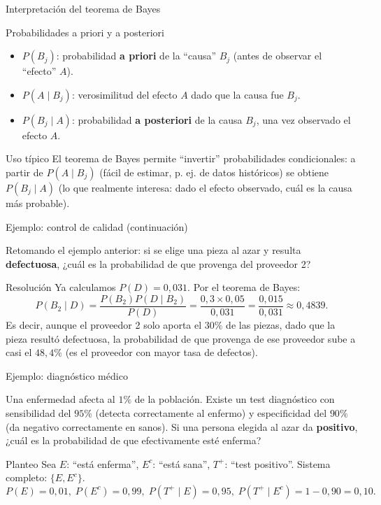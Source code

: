 \documentclass[aspectratio=169,11pt]{beamer}
\begin{document}
\begin{frame}{Interpretación del teorema de Bayes}
\begin{block}{Probabilidades a priori y a posteriori}
\begin{itemize}
\item $P(B_j)$: probabilidad \textbf{a priori} de la ``causa'' $B_j$ (antes de observar el ``efecto'' $A$).
\item $P(A\mid B_j)$: verosimilitud del efecto $A$ dado que la causa fue $B_j$.
\item $P(B_j\mid A)$: probabilidad \textbf{a posteriori} de la causa $B_j$, una vez observado el efecto $A$.
\end{itemize}
\end{block}
\begin{alertblock}{Uso típico}
El teorema de Bayes permite ``invertir'' probabilidades condicionales: a partir de $P(A\mid B_j)$ (fácil de estimar, p. ej. de datos históricos) se obtiene $P(B_j\mid A)$ (lo que realmente interesa: dado el efecto observado, cuál es la causa más probable).
\end{alertblock}
\end{frame}

\begin{frame}{Ejemplo: control de calidad (continuación)}
\begin{example}
Retomando el ejemplo anterior: si se elige una pieza al azar y resulta \textbf{defectuosa}, ¿cuál es la probabilidad de que provenga del proveedor 2?
\end{example}
\begin{block}{Resolución}
Ya calculamos $P(D) = 0{,}031$. Por el teorema de Bayes:
\[
P(B_2\mid D) = \frac{P(B_2)P(D\mid B_2)}{P(D)} = \frac{0{,}3 \times 0{,}05}{0{,}031} = \frac{0{,}015}{0{,}031} \approx 0{,}4839.
\]
Es decir, aunque el proveedor 2 solo aporta el $30\%$ de las piezas, dado que la pieza resultó defectuosa, la probabilidad de que provenga de ese proveedor sube a casi el $48{,}4\%$ (es el proveedor con mayor tasa de defectos).
\end{block}
\end{frame}

\begin{frame}{Ejemplo: diagnóstico médico}
\begin{example}
Una enfermedad afecta al $1\%$ de la población. Existe un test diagnóstico con sensibilidad del $95\%$ (detecta correctamente al enfermo) y especificidad del $90\%$ (da negativo correctamente en sanos). Si una persona elegida al azar da \textbf{positivo}, ¿cuál es la probabilidad de que efectivamente esté enferma?
\end{example}
\begin{block}{Planteo}
Sea $E$: ``está enferma'', $E^c$: ``está sana'', $T^+$: ``test positivo''. Sistema completo: $\{E,E^c\}$.
\[
P(E)=0{,}01,\; P(E^c)=0{,}99,\; P(T^+\mid E) = 0{,}95,\; P(T^+\mid E^c) = 1-0{,}90 = 0{,}10.
\]
\end{block}
\end{frame}
\end{document}
